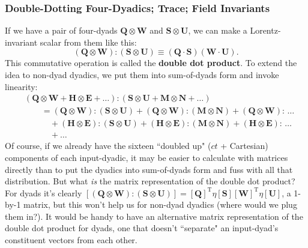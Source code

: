 \documentclass[12pt]{article}
\renewcommand{\vv}[1]{\mathbf{#1}}
\begin{document}
\subsubsection{Double-Dotting Four-Dyadics; Trace; Field Invariants}

If we have a pair of four-dyads $\vv Q \otimes \vv W$ and $\vv S \otimes \vv U$, we can make a Lorentz-invariant scalar from them like this:
\begin{equation*}
(\vv Q \otimes \vv W) : (\vv S \otimes \vv U) \equiv (\vv Q \cdot \vv S) (\vv W \cdot \vv U).
\end{equation*}
This commutative operation is called the \textbf{double dot product}. To extend the idea to non-dyad dyadics, we put them into sum-of-dyads form and invoke linearity:
\begin{equation*}
\begin{aligned}
&(\vv Q \otimes \vv W + \vv H \otimes \vv E + \dots) : (\vv S \otimes \vv U + \vv M \otimes \vv N + \dots) \\[3pt]
&\qquad = (\vv Q \otimes \vv W) : (\vv S \otimes \vv U) + (\vv Q \otimes \vv W) : (\vv M \otimes \vv N) + (\vv Q \otimes \vv W) : \, \dots \\
& \qquad \quad + (\vv H \otimes \vv E) : (\vv S \otimes \vv U) + (\vv H \otimes \vv E) : (\vv M \otimes \vv N) + (\vv H \otimes \vv E) : \, \dots \\
& \qquad \quad + \dots
\end{aligned}
\end{equation*}
Of course, if we already have the sixteen ``doubled up" ($ct$ + Cartesian) components of each input-dyadic, it may be easier to calculate with matrices directly than to put the dyadics into sum-of-dyads form and fuss with all that distribution. But what \emph{is} the matrix representation of the double dot product? For dyads it's clearly $[ (\vv Q \otimes \vv W) : (\vv S \otimes \vv U) ] = [\vv Q]^{\mathrm{T}} \eta [\vv S] [\vv W]^{\mathrm{T}} \eta [\vv U]$, a 1-by-1 matrix, but this won't help us for non-dyad dyadics (where would we plug them in?). It would be handy to have an alternative matrix representation of the double dot product for dyads, one that doesn't ``separate" an input-dyad's constituent vectors from each other.
\end{document}
